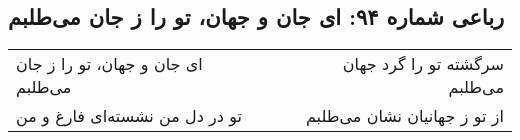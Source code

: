 \begin{center}
\section*{رباعی شماره ۹۴: ای جان و جهان، تو را ز جان می‌طلبم}
\label{sec:094}
\begin{longtable}{l p{0.5cm} r}
ای جان و جهان، تو را ز جان می‌طلبم
&&
سرگشته تو را گرد جهان می‌طلبم
\\
تو در دل من نشسته‌ای فارغ و من
&&
از تو ز جهانیان نشان می‌طلبم
\\
\end{longtable}
\end{center}
